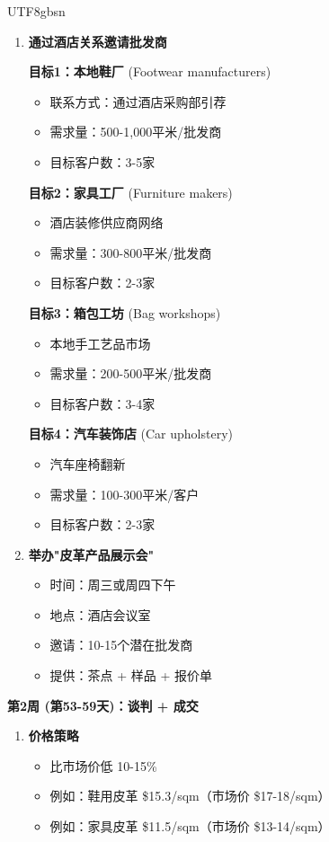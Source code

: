 \documentclass[12pt,a4paper]{article}
\begin{document}
\begin{CJK}{UTF8}{gbsn}
\begin{enumerate}
    \item \textbf{通过酒店关系邀请批发商}
    
    \textbf{目标1：本地鞋厂} (Footwear manufacturers)
    \begin{itemize}
        \item 联系方式：通过酒店采购部引荐
        \item 需求量：500-1,000平米/批发商
        \item 目标客户数：3-5家
    \end{itemize}
    
    \textbf{目标2：家具工厂} (Furniture makers)
    \begin{itemize}
        \item 酒店装修供应商网络
        \item 需求量：300-800平米/批发商
        \item 目标客户数：2-3家
    \end{itemize}
    
    \textbf{目标3：箱包工坊} (Bag workshops)
    \begin{itemize}
        \item 本地手工艺品市场
        \item 需求量：200-500平米/批发商
        \item 目标客户数：3-4家
    \end{itemize}
    
    \textbf{目标4：汽车装饰店} (Car upholstery)
    \begin{itemize}
        \item 汽车座椅翻新
        \item 需求量：100-300平米/客户
        \item 目标客户数：2-3家
    \end{itemize}
    
    \item \textbf{举办"皮革产品展示会"}
    \begin{itemize}
        \item 时间：周三或周四下午
        \item 地点：酒店会议室
        \item 邀请：10-15个潜在批发商
        \item 提供：茶点 + 样品 + 报价单
    \end{itemize}
\end{enumerate}

\textbf{第2周 (第53-59天)：谈判 + 成交}

\begin{enumerate}
    \item \textbf{价格策略}
    \begin{itemize}
        \item 比市场价低 10-15\%
        \item 例如：鞋用皮革 \$15.3/sqm（市场价 \$17-18/sqm）
        \item 例如：家具皮革 \$11.5/sqm（市场价 \$13-14/sqm）
    \end{itemize}
    

\end{enumerate}
\end{CJK}
\end{document}
